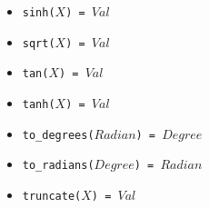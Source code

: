 \documentclass[10pt]{article}
\begin{document}
\begin{multicols}{2}
\begin{scriptsize}
\begin{itemize}
   \item \texttt{sinh($X$) = $Val$} 
   \item \texttt{sqrt($X$) = $Val$} 
   \item \texttt{tan($X$) = $Val$}
   \item \texttt{tanh($X$) = $Val$} 
   \item \texttt{to\_degrees($Radian$) = $Degree$} 
   \item \texttt{to\_radians($Degree$) = $Radian$}
   \item \texttt{truncate($X$) = $Val$}  
\end{itemize}
\end{scriptsize}


\end{multicols}
\end{document}
